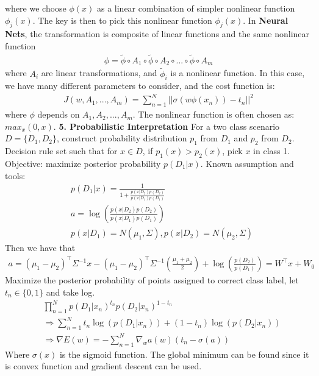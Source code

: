 \documentclass[11pt]{article}
\theoremstyle{plain}
\theoremstyle{definition}
\begin{document}
where we choose $\phi(x)$ as a linear combination of simpler nonlinear function $\phi_j(x)$. The key is then to pick this nonlinear function $\phi_j(x)$. In \textbf{Neural Nets}, the transformation is composite of linear functions and the same nonlinear function\begin{align*}
\phi = \tilde{\phi} \circ A_1 \circ \tilde{\phi} \circ A_2 \circ ... \circ \tilde{\phi} \circ A_m
\end{align*}
where $A_i$ are linear transformations, and $\tilde{\phi}_i$ is a nonlinear function. In this case, we have many different parameters to consider, and the cost function is: \begin{align*}
J(w, A_1, ..., A_m) = \sum\limits_{n=1}^N ||\sigma(w\phi(x_n))-t_n ||^2
\end{align*} 
where $\phi$ depends on $A_1, A_2, ..., A_m$. The nonlinear function is often chosen as: $max_{x}(0,x)$.
\vspace{10mm} \newline 
\textbf{5. Probabilistic Interpretation}\newline
\vspace{5mm}
For a two class scenario $D = \{ D_1, D_2 \}$, construct probability distribution $p_1$ from $D_1$ and $p_2$ from $D_2$. Decision rule set such that for $x \in D$, if $p_1(x) > p_2(x)$, pick $x$ in class 1. \newline 
Objective: maximize posterior probability $p(D_1 | x)$. Known assumption and tools: \begin{align*}
&p(D_1 |x) = \frac{1}{1+\frac{p(x|D_2)p(D_2)}{p(x|D_1)p(D_1)}}\\
&a = \log(\frac{p(x|D_2)p(D_2)}{p(x|D_1)p(D_1)})\\
&p(x|D_1) = N(\mu_1, \Sigma), p(x|D_2) = N(\mu_2, \Sigma)
\end{align*}
Then we have that \begin{align*}
a = (\mu_1 - \mu_2)^\top \Sigma^{-1} x - (\mu_1 - \mu_2)^\top \Sigma^{-1} (\frac{\mu_1 + \mu_2}{2}) + \log(\frac{p(D_2)}{p(D_1)}) = W^\top x + W_0
\end{align*}
Maximize the posterior probability of points assigned to correct class label, let $t_n \in \{ 0, 1\}$ and take log. \begin{align*}
&\prod\limits_{n=1}^{N} p(D_1|x_n)^{t_n}p(D_2|x_n)^{1-t_n} \\
&\Longrightarrow \sum\limits_{n=1}^{N} t_n \log(p(D_1|x_n)) + (1-t_n)\log(p(D_2 | x_n))\\
&\Longrightarrow \nabla E(w) = -\sum\limits_{n=1}^{N} \nabla_w a(w) (t_n - \sigma(a))
\end{align*}
Where $\sigma(x)$ is the sigmoid function. The global minimum can be found since it is convex function and gradient descent can be used.
\end{document}
